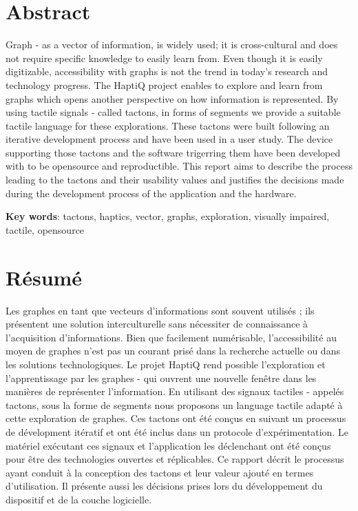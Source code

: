 
\section*{Abstract}
Graph - as a vector of information, is widely used; it is cross-cultural and does not require specific knowledge to easily learn from. Even though it is easily digitizable, accessibility with graphs is not the trend in today's research and technology progress. The HaptiQ project enables to explore and learn from graphs which opens another perspective on how information is represented. By using tactile signals - called tactons, in forms of segments we provide a suitable tactile language for these explorations. These tactons were built following an iterative development process and have been used in a user study. The device supporting those tactons and the software trigerring them have been developed with to be opensource and reproductible.
This report aims to describe the process leading to the tactons and their usability values and justifies the decisions made during the development process of the application and the hardware.

\noindent\textbf{Key words}: tactons, haptics, vector, graphs, exploration, visually impaired, tactile, opensource

\section*{Résumé}
Les graphes en tant que vecteurs d'informations sont souvent utilisés ; ils présentent une solution interculturelle sans nécessiter de connaissance à l'acquisition d'informations. Bien que facilement numérisable, l'accessibilité au moyen de graphes n'est pas un courant prisé dans la recherche actuelle ou dans les solutions technologiques. Le projet HaptiQ rend possible l'exploration et l'apprentissage par les graphes - qui ouvrent une nouvelle fenêtre dans les manières de représenter l'information. En utilisant des signaux tactiles - appelés tactons, sous la forme de segments nous proposons un language tactile adapté à cette exploration de graphes. Ces tactons ont été conçus en suivant un processus de dévelopment itératif et ont été inclus dans un protocole d'expérimentation. Le matériel exécutant ces signaux et l'application les déclenchant ont été conçus pour être des technologies ouvertes et réplicables.
Ce rapport décrit le processus ayant conduit à la conception des tactons et leur valeur ajouté en termes d'utilisation. Il présente aussi les décisions prises lors du développement du dispositif et de la couche logicielle.
